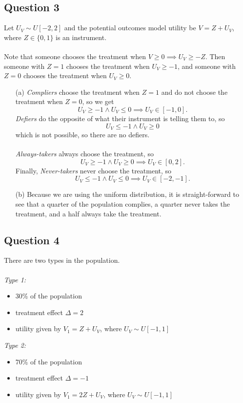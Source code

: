 \documentclass[12pt]{article}
\begin{document}
\subsection*{Question 3}
Let $U_V \sim U[-2,2]$ and the potential outcomes model utility be $V = Z + U_V$, where $Z \in \{0,1\}$ is an instrument. 
\\\\
Note that someone chooses the treatment when $V \geq 0 \implies U_V \geq -Z$. Then someone with $Z=1$ chooses the treatment when $U_V \geq -1$, and someone with $Z = 0$ chooses the treatment when $U_V \geq 0$. 
\begin{enumerate}
    \item[(a)] \emph{Compliers} choose the treatment when $Z=1$ and do not choose the treatment when $Z=0$, so we get 
        \[ U_V \geq -1 \wedge U_V \leq 0 \implies U_V \in [-1,0] .\]
        \emph{Defiers} do the opposite of what their instrument is telling them to, so
        \[ U_V \leq -1 \wedge U_V \geq 0 \]
        which is not possible, so there are no defiers. \\
        \\
        \emph{Always-takers} always choose the treatment, so 
        \[ U_V \geq -1 \wedge U_V \geq 0 \implies U_V \in [0,2].\]
        Finally, \emph{Never-takers} never choose the treatment, so
        \[ U_V \leq -1 \wedge U_V \leq 0 \implies U_V \in [-2,-1].\]
    \item[(b)] Because we are using the uniform distribution, it is straight-forward to see that a quarter of the population complies, a quarter never takes the treatment, and a half always take the treatment. 
\end{enumerate}


\subsection*{Question 4}
There are two types in the population. 
\\\\
\emph{Type 1:}
\begin{itemize}
    \item 30\% of the population
    \item treatment effect $\Delta = 2$
    \item utility given by $V_1 = Z + U_V$, where $U_V \sim U[-1,1]$
\end{itemize}

\emph{Type 2:}
\begin{itemize}
    \item 70\% of the population
    \item treatment effect $\Delta = -1$
    \item utility given by $V_1 = 2Z + U_V$, where $U_V \sim U[-1,1]$
\end{itemize}
\end{document}

